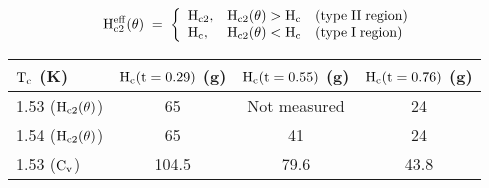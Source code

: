 {\newpage
\clearpage
\samepage \begin{figure}\vspace{18cm}

\label{TaN}
\end{figure}
}

{\newpage
\clearpage
\samepage \begin{figure}%
\vspace{7.5in}

\label{thetatemp}
\end{figure}
}

{\newpage
\clearpage
\samepage \begin{equation}%
\label{typeItheta}
\rm H_{c2}^{eff}(\theta) \; = \; \left\{ \begin{array}{lll}
				  \rm H_{c2}, & \rm H_{c2}(\theta) > H_c & {\rm
(type \;  II \; region)} \\  
\rm H_c, & \rm H_{c2}(\theta) < H_c & {\rm (type \; I \; region)}
				  \end{array} \right.
\end{equation}
}

{\newpage
\clearpage
\samepage \begin{figure}%
\vspace{7.5in}

\label{hctemp}
\end{figure}
}

{\newpage
\clearpage
\samepage \begin{table}%

\label{htherm_table}
\begin{center}
\begin{tabular}{|l|ccc|}
\hline
$\rm T_c$ (K) & $\rm H_c(t = 0.29)$ (g)& $\rm H_c(t = 0.55)$ (g)&  $\rm H_c(t =
0.76)$ (g) \\ 
\hline
1.53 ($\rm H_{c2}(\theta)$) & 65 & Not measured & 24 \\ 
1.54 ($\rm H_{c2}(\theta)$) & 65 & 41 & 24 \\ 
1.53 ($\rm C_v$) & 104.5 & 79.6 & 43.8 \\ 
\hline
\end{tabular}
\end{center}
\end{table}
}

{\newpage
\clearpage
\samepage \begin{figure}\vspace{15cm}

\label{transhape}
\end{figure}
}

